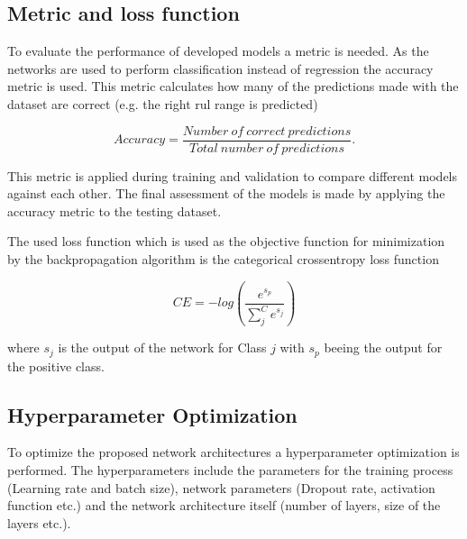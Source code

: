 \documentclass[conference]{IEEEtran}
\begin{document}


\subsection{Metric and loss function}
\label{sec:metric_and_loss_function}

To evaluate the performance of developed models a metric is needed. As the networks are used to perform classification instead of regression the accuracy metric is used. This metric calculates how many of the predictions made with the dataset are correct (e.g. the right \gls{rul} range is predicted)

\begin{equation}
	\label{eq:accuracy_metric}
	Accuracy = \frac{Number \: of \: correct \: predictions}{Total \: number \: of \: predictions}.
\end{equation}

This metric is applied during training and validation to compare different models against each other. The final assessment of the models is made by applying the accuracy metric to the testing dataset.

The used loss function which is used as the objective function for minimization by the backpropagation algorithm is the categorical crossentropy loss function

\begin{equation}
	\label{eq:categorical-cross-entrophy}
	CE = -log(\frac{e^{s_p}}{\sum_{j}^{C} e^{s_j}})	
\end{equation}

where $ s_j $ is the output of the network for Class $ j $ with $ s_p $ beeing the output for the positive class.


\subsection{Hyperparameter Optimization}
\label{sec:hyperparameter_optimization_method}

To optimize the proposed network architectures a hyperparameter optimization is performed. The hyperparameters include the parameters for the training process (Learning rate and batch size), network parameters (Dropout rate, activation function etc.) and the network architecture itself (number of layers, size of the layers etc.).
\end{document}
